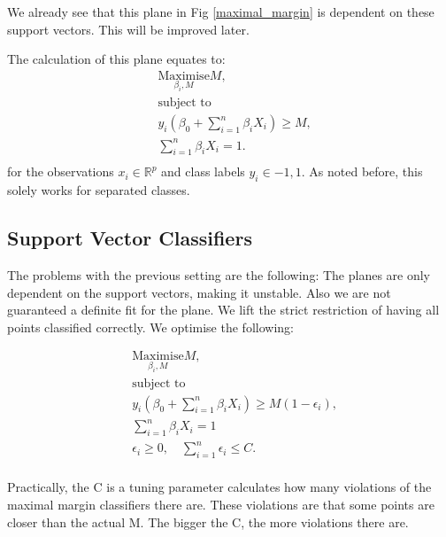 \documentclass{article}
\begin{document}
We already see that this plane in Fig \ref{maximal_margin} is dependent on these support vectors. This will be improved later.

The calculation of this plane equates to: 
\begin{align}
& \underset{\beta_i,M}{\text{Maximise}} M,\\
& \text{subject to} \\
&y_i(\beta_0+\sum_{i=1}^n \beta_i X_i )\geq M,\\
&\sum_{i=1}^n \beta_i X_i = 1.\\
\end{align}
for the observations $x_i \in \mathbb{R}^p$ and class labels $y_i \in {-1,1}$. As noted before, this solely works for separated classes. 

\subsection{Support Vector Classifiers}
The problems with the previous setting are the following: The planes are only dependent on the support vectors, making it unstable. Also we are not guaranteed a definite fit for the plane. We lift the strict restriction of having all points classified correctly. We optimise the following: 

\begin{align}
& \underset{\beta_i,M}{\text{Maximise}} M,\\
& \text{subject to} \\
&y_i(\beta_0+\sum_{i=1}^n \beta_i X_i )\geq M(1-\epsilon_i), \label{line_eq_support}\\
&\sum_{i=1}^n \beta_i X_i = 1\\
&\epsilon_i \geq 0, \quad \sum_{i=1}^n\epsilon_i \leq C.\\
\end{align}

Practically, the C is a tuning parameter calculates how many violations of the maximal margin classifiers there are. These violations are that some points are closer than the actual M. The bigger the C, the more violations there are. 
\end{document}
